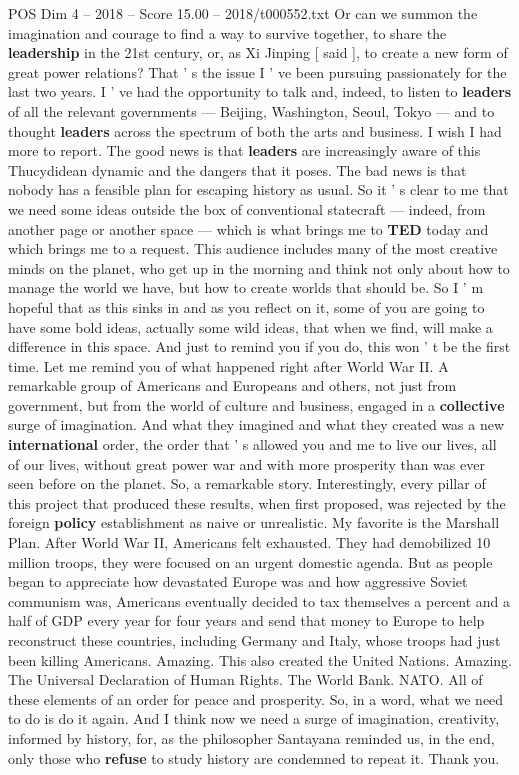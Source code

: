 \begin{textsample}{POS Dim 4 – 2018 – Score 15.00 – 2018/t000552.txt}
Or can we summon the imagination and courage to find a way to survive together, to share the \textbf{leadership} in the 21st century, or, as Xi Jinping [ said ], to create a new form of great power relations?
That ' s the issue I ' ve been pursuing passionately for the last two years.
I ' ve had the opportunity to talk and, indeed, to listen to \textbf{leaders} of all the relevant governments — Beijing, Washington, Seoul, Tokyo — and to thought \textbf{leaders} across the spectrum of both the arts and business.
I wish I had more to report.
The good news is that \textbf{leaders} are increasingly aware of this Thucydidean dynamic and the dangers that it poses.
The bad news is that nobody has a feasible plan for escaping history as usual.
So it ' s clear to me that we need some ideas outside the box of conventional statecraft — indeed, from another page or another space — which is what brings me to \textbf{TED} today and which brings me to a request.
This audience includes many of the most creative minds on the planet, who get up in the morning and think not only about how to manage the world we have, but how to create worlds that should be.
So I ' m hopeful that as this sinks in and as you reflect on it, some of you are going to have some bold ideas, actually some wild ideas, that when we find, will make a difference in this space.
And just to remind you if you do, this won ' t be the first time.
Let me remind you of what happened right after World War II.
A remarkable group of Americans and Europeans and others, not just from government, but from the world of culture and business, engaged in a \textbf{collective} surge of imagination.
And what they imagined and what they created was a new \textbf{international} order, the order that ' s allowed you and me to live our lives, all of our lives, without great power war and with more prosperity than was ever seen before on the planet.
So, a remarkable story.
Interestingly, every pillar of this project that produced these results, when first proposed, was rejected by the foreign \textbf{policy} establishment as naive or unrealistic.
My favorite is the Marshall Plan.
After World War II, Americans felt exhausted.
They had demobilized 10 million troops, they were focused on an urgent domestic agenda.
But as people began to appreciate how devastated Europe was and how aggressive Soviet communism was, Americans eventually decided to tax themselves a percent and a half of GDP every year for four years and send that money to Europe to help reconstruct these countries, including Germany and Italy, whose troops had just been killing Americans.
Amazing.
This also created the United Nations.
Amazing.
The Universal Declaration of Human Rights.
The World Bank.
NATO.
All of these elements of an order for peace and prosperity.
So, in a word, what we need to do is do it again.
And I think now we need a surge of imagination, creativity, informed by history, for, as the philosopher Santayana reminded us, in the end, only those who \textbf{refuse} to study history are condemned to repeat it.
Thank you.

\end{textsample}
